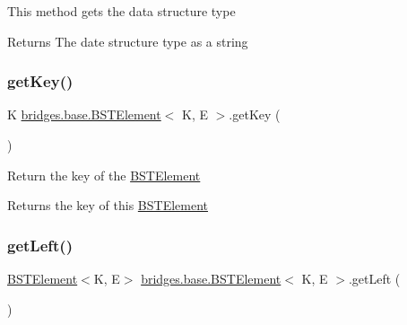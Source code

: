 This method gets the data structure type

\begin{DoxyReturn}{Returns}
The date structure type as a string 
\end{DoxyReturn}
\mbox{\label{classbridges_1_1base_1_1_b_s_t_element_afba950fad36d3327b01003df3ba4cc9f}} 
\subsubsection{\texorpdfstring{get\+Key()}{getKey()}}
{\footnotesize\ttfamily K \mbox{\hyperlink{classbridges_1_1base_1_1_b_s_t_element}{bridges.\+base.\+B\+S\+T\+Element}}$<$ K, E $>$.get\+Key (\begin{DoxyParamCaption}{ }\end{DoxyParamCaption})}

Return the key of the \mbox{\hyperlink{classbridges_1_1base_1_1_b_s_t_element}{B\+S\+T\+Element}}

\begin{DoxyReturn}{Returns}
the key of this \mbox{\hyperlink{classbridges_1_1base_1_1_b_s_t_element}{B\+S\+T\+Element}} 
\end{DoxyReturn}
\mbox{\label{classbridges_1_1base_1_1_b_s_t_element_a8abdd6e4a0486de7fa45fbb233b56688}} 
\subsubsection{\texorpdfstring{get\+Left()}{getLeft()}}
{\footnotesize\ttfamily \mbox{\hyperlink{classbridges_1_1base_1_1_b_s_t_element}{B\+S\+T\+Element}}$<$K, E$>$ \mbox{\hyperlink{classbridges_1_1base_1_1_b_s_t_element}{bridges.\+base.\+B\+S\+T\+Element}}$<$ K, E $>$.get\+Left (\begin{DoxyParamCaption}{ }\end{DoxyParamCaption})}

\mbox{\label{classbridges_1_1base_1_1_b_s_t_element_ae7ed1b98f48acfcfc0a3a5bf6219ce00}} 
